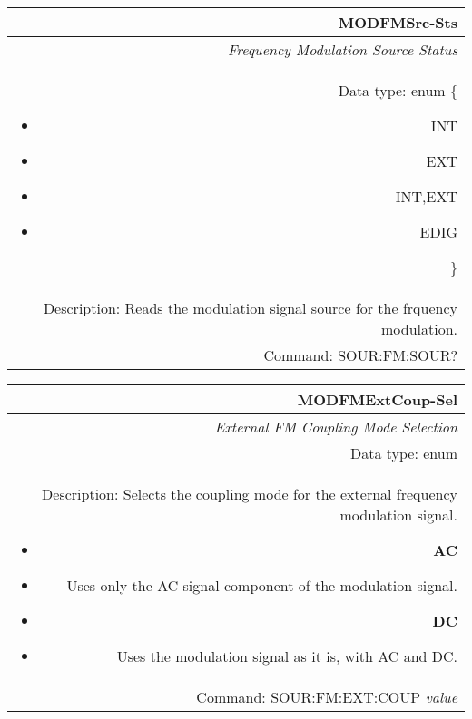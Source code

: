 \documentclass[openany]{article}
\begin{document}
		\begin{tabular}{N}
			\hline
			\bfseries MODFMSrc-Sts \\ \hline
			\emph{Frequency Modulation Source Status} \\
			Data type: enum \{\begin{itemize}[noitemsep]
				\small
				\item[] INT
				\item[] EXT
				\item[] INT,EXT
				\item[] EDIG
			\end{itemize}\} \\ 
			Description: Reads the modulation signal source for the frquency modulation. \\
			Command: SOUR:FM:SOUR? \\

		\end{tabular}
%
		\begin{tabular}{N}
			\hline
			\bfseries MODFMExtCoup-Sel \\ \hline
			\emph{External FM Coupling Mode Selection} \\
			Data type: enum \\  
			Description: Selects the coupling mode for the external frequency modulation signal.\begin{itemize}[noitemsep]
				\small
				\item[] \textbf{AC}
				\item[] Uses only the AC signal component of the modulation signal.
				\item[] \textbf{DC}
				\item[] Uses the modulation signal as it is, with AC and DC.	
			\end{itemize} \\
			Command: SOUR:FM:EXT:COUP \emph{value} \\

		\end{tabular}
\end{document}
